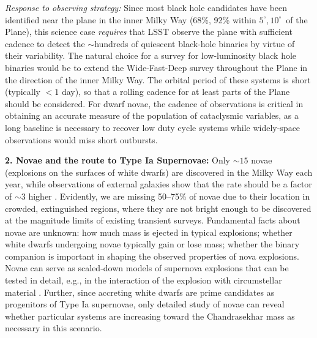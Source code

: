 {\it Response to observing strategy:} Since most black hole candidates
have been identified near the plane in the inner Milky Way (68\%, 92\%
within $5^{\circ}, 10^{\circ}$~of the Plane), this science case {\it
    requires} that LSST observe the plane with sufficient cadence to
  detect the $\sim$hundreds of quiescent black-hole binaries by virtue
  of their variability. The natural choice for a survey for
  low-luminosity black hole binaries would be to extend the
  Wide-Fast-Deep survey throughout the Plane in the direction of the
  inner Milky Way. The orbital period of these systems is short (typically $<1$ day), so that a rolling cadence
  for at least parts of the Plane should be considered. For dwarf novae, the cadence of observations
  is critical in obtaining an accurate measure of the population of
  cataclysmic variables, as a long baseline is necessary to recover
  low duty cycle systems while widely-space observations
 would miss short outbursts.



{\bf 2. Novae and the route to Type Ia Supernovae:} Only $\sim 15$
novae (explosions on the surfaces of white dwarfs) are discovered in
the Milky Way each year, while observations of external galaxies show
that the rate should be a factor of $\sim 3$ higher
\citep{2014ASPC..490...77S}.
Evidently, we are missing 50--75\% of novae due to their
location in crowded, extinguished regions, where they are not bright
enough to be discovered at the magnitude limits of existing transient
surveys. Fundamental facts about novae are unknown: how much mass is
ejected in typical explosions; whether white dwarfs undergoing novae
typically gain or lose mass; whether the binary companion is important
in shaping the observed properties of nova explosions. Novae can serve
as scaled-down models of supernova explosions that can be tested in
detail, e.g., in the interaction of the explosion with circumstellar
material \citep[e.g.,][]{2015arXiv151007662C}.  Further, since accreting white
dwarfs are prime candidates as progenitors of Type Ia supernovae, only
detailed study of novae can reveal whether particular systems are
increasing toward the Chandrasekhar mass as necessary in this
scenario.

